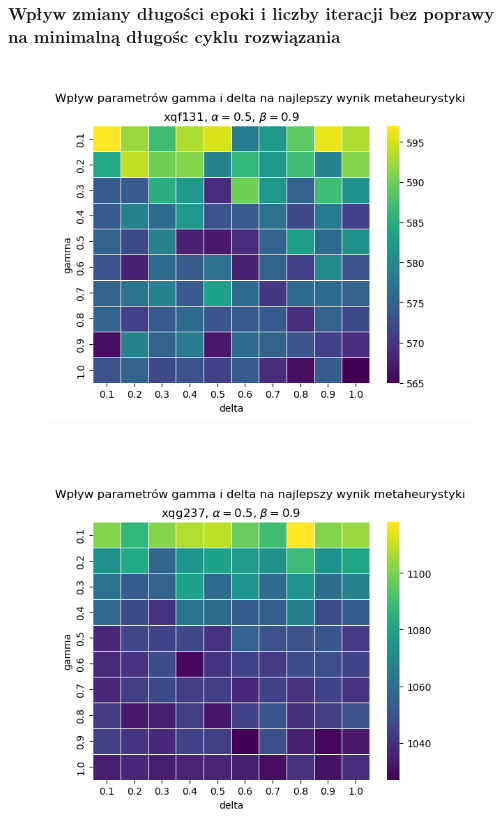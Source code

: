 \documentclass{article}
\begin{document}
\newpage

\subsubsection{Wpływ zmiany długości epoki i liczby iteracji bez poprawy na minimalną długośc cyklu rozwiązania}
    \begin{figure}[h!]
        \centering
        \includegraphics[height=10.0cm]{../../plots/sa-tuning-gamma-delta-min-xqf131.png}
    \end{figure}

    \begin{figure}[h!]
        \centering
        \includegraphics[height=10.0cm]{../../plots/sa-tuning-gamma-delta-min-xqg237.png}
    \end{figure}
\newpage
\end{document}
